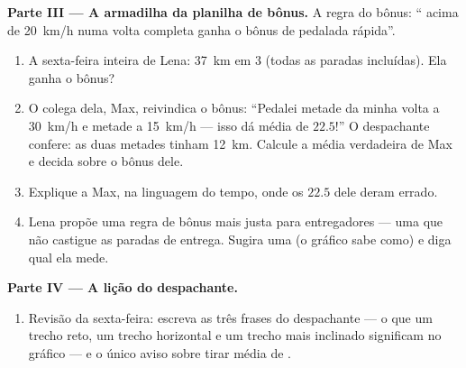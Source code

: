 \begin{problem}
\medskip\noindent\textbf{Parte III --- A armadilha da planilha de
bônus.}
A regra do bônus: `` acima de \qty{20}{km/h} numa
volta completa ganha o bônus de pedalada rápida''.
\begin{enumerate}[resume]
  \item A sexta-feira inteira de Lena: \qty{37}{km} em $3$ 
        (todas as paradas incluídas). Ela ganha o bônus?
  \item O colega dela, Max, reivindica o bônus: ``Pedalei metade da
        minha volta a \qty{30}{km/h} e metade a \qty{15}{km/h} ---
        isso dá média de $22.5$!'' O despachante confere: as duas
        metades tinham \qty{12}{km}. Calcule a média verdadeira de
        Max e decida sobre o bônus dele.
  \item Explique a Max, na linguagem do tempo, onde os $22.5$ dele
        deram errado.
  \item Lena propõe uma regra de bônus mais justa para entregadores
        --- uma que não castigue as paradas de entrega. Sugira uma (o
        gráfico sabe como) e diga qual  ela mede.
\end{enumerate}

\medskip\noindent\textbf{Parte IV --- A lição do despachante.}
\begin{enumerate}[resume]
  \item Revisão da sexta-feira: escreva as três frases do
        despachante --- o que um trecho reto, um trecho horizontal e
        um trecho mais inclinado significam no gráfico --- e o único
        aviso sobre tirar média de .
\end{enumerate}
\end{problem}
